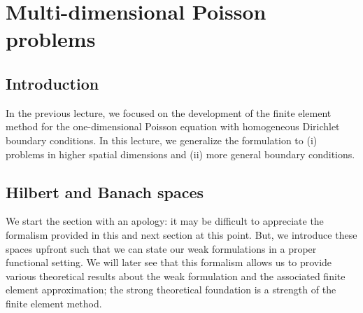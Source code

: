 \chapter{Multi-dimensional Poisson problems}

\disclaimer

\section{Introduction}
In the previous lecture, we focused on the development of the finite element method for the one-dimensional Poisson equation with homogeneous Dirichlet boundary conditions. In this lecture, we generalize the formulation to (i) problems in higher spatial dimensions and (ii) more general boundary conditions.  

\section{Hilbert and Banach spaces}
We start the section with an apology: it may be difficult to appreciate the formalism provided in this and next section at this point.  But, we introduce these spaces upfront such that we can state our weak formulations in a proper functional setting.  We will later see that this formalism allows us to provide various theoretical results about the weak formulation and the associated finite element approximation; the strong theoretical foundation is a strength of the finite element method. 

